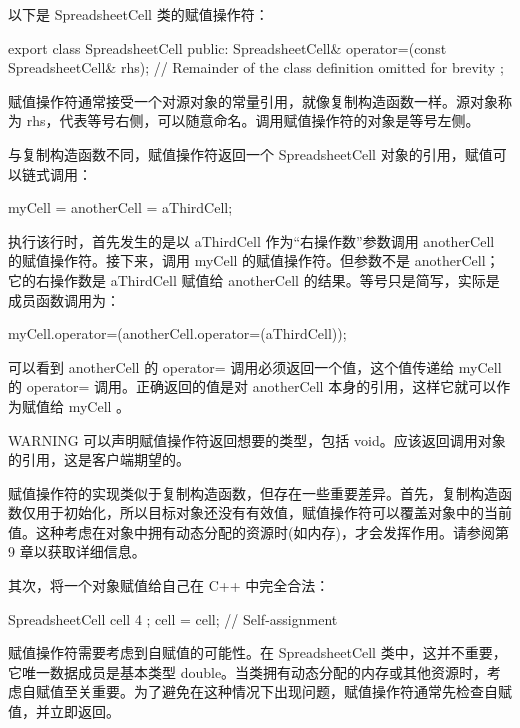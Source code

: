 
以下是 SpreadsheetCell 类的赋值操作符：

\begin{cpp}
export class SpreadsheetCell
{
    public:
        SpreadsheetCell& operator=(const SpreadsheetCell& rhs);
        // Remainder of the class definition omitted for brevity
};
\end{cpp}

赋值操作符通常接受一个对源对象的常量引用，就像复制构造函数一样。源对象称为 rhs，代表等号右侧，可以随意命名。调用赋值操作符的对象是等号左侧。

与复制构造函数不同，赋值操作符返回一个 SpreadsheetCell 对象的引用，赋值可以链式调用：

\begin{cpp}
myCell = anotherCell = aThirdCell;
\end{cpp}

执行该行时，首先发生的是以 aThirdCell 作为“右操作数”参数调用 anotherCell 的赋值操作符。接下来，调用 myCell 的赋值操作符。但参数不是 anotherCell；它的右操作数是 aThirdCell 赋值给 anotherCell 的结果。等号只是简写，实际是成员函数调用为：

\begin{cpp}
myCell.operator=(anotherCell.operator=(aThirdCell));
\end{cpp}

可以看到 anotherCell 的 operator= 调用必须返回一个值，这个值传递给 myCell 的 operator= 调用。正确返回的值是对 anotherCell 本身的引用，这样它就可以作为赋值给 myCell 。

\begin{myWarning}{WARNING}
可以声明赋值操作符返回想要的类型，包括 void。应该返回调用对象的引用，这是客户端期望的。
\end{myWarning}


赋值操作符的实现类似于复制构造函数，但存在一些重要差异。首先，复制构造函数仅用于初始化，所以目标对象还没有有效值，赋值操作符可以覆盖对象中的当前值。这种考虑在对象中拥有动态分配的资源时(如内存)，才会发挥作用。请参阅第 9 章以获取详细信息。

其次，将一个对象赋值给自己在 C++ 中完全合法：

\begin{cpp}
SpreadsheetCell cell { 4 };
cell = cell; // Self-assignment
\end{cpp}

赋值操作符需要考虑到自赋值的可能性。在 SpreadsheetCell 类中，这并不重要，它唯一数据成员是基本类型 double。当类拥有动态分配的内存或其他资源时，考虑自赋值至关重要。为了避免在这种情况下出现问题，赋值操作符通常先检查自赋值，并立即返回。

